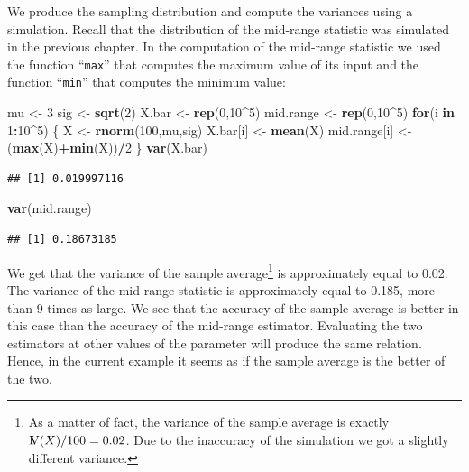\documentclass[]{krantz}
\makeatletter
\newenvironment{Shaded}{\begin{snugshade}}{\end{snugshade}}
\newcommand{\ControlFlowTok}[1]{\textcolor[rgb]{0.13,0.29,0.53}{\textbf{#1}}}
\newcommand{\DecValTok}[1]{\textcolor[rgb]{0.00,0.00,0.81}{#1}}
\newcommand{\KeywordTok}[1]{\textcolor[rgb]{0.13,0.29,0.53}{\textbf{#1}}}
\newcommand{\NormalTok}[1]{#1}
\newcommand{\OperatorTok}[1]{\textcolor[rgb]{0.81,0.36,0.00}{\textbf{#1}}}
\newcommand{\StringTok}[1]{\textcolor[rgb]{0.31,0.60,0.02}{#1}}
\newcommand{\Var}{{\rm I\kern-.3em V}}
\newenvironment{kframe}{%
\medskip{}
\setlength{\fboxsep}{.8em}
 \def\at@end@of@kframe{}%
 \ifinner\ifhmode%
  \def\at@end@of@kframe{\end{minipage}}%
  \begin{minipage}{\columnwidth}%
 \fi\fi%
 \def\FrameCommand##1{\hskip\@totalleftmargin \hskip-\fboxsep
 \colorbox{shadecolor}{##1}\hskip-\fboxsep
     \hskip-\linewidth \hskip-\@totalleftmargin \hskip\columnwidth}%
 \MakeFramed {\advance\hsize-\width
   \@totalleftmargin\z@ \linewidth\hsize
   \@setminipage}}%
 {\par\unskip\endMakeFramed%
 \at@end@of@kframe}
\renewenvironment{Shaded}{\begin{kframe}}{\end{kframe}}
\theoremstyle{definition}
\theoremstyle{definition}
\theoremstyle{definition}
\theoremstyle{remark}
\makeatother
\begin{document}
We produce the sampling distribution and compute the variances using a
simulation. Recall that the distribution of the mid-range statistic was
simulated in the previous chapter. In the computation of the mid-range
statistic we used the function ``\texttt{max}'' that computes the maximum value
of its input and the function ``\texttt{min}'' that computes the minimum value:

\begin{Shaded}
\begin{Highlighting}[]
\NormalTok{mu <-}\StringTok{ }\DecValTok{3}
\NormalTok{sig <-}\StringTok{ }\KeywordTok{sqrt}\NormalTok{(}\DecValTok{2}\NormalTok{)}
\NormalTok{X.bar <-}\StringTok{ }\KeywordTok{rep}\NormalTok{(}\DecValTok{0}\NormalTok{,}\DecValTok{10}\OperatorTok{^}\DecValTok{5}\NormalTok{)}
\NormalTok{mid.range <-}\StringTok{ }\KeywordTok{rep}\NormalTok{(}\DecValTok{0}\NormalTok{,}\DecValTok{10}\OperatorTok{^}\DecValTok{5}\NormalTok{)}
\ControlFlowTok{for}\NormalTok{(i }\ControlFlowTok{in} \DecValTok{1}\OperatorTok{:}\DecValTok{10}\OperatorTok{^}\DecValTok{5}\NormalTok{) \{}
\NormalTok{  X <-}\StringTok{ }\KeywordTok{rnorm}\NormalTok{(}\DecValTok{100}\NormalTok{,mu,sig)}
\NormalTok{  X.bar[i] <-}\StringTok{ }\KeywordTok{mean}\NormalTok{(X)}
\NormalTok{  mid.range[i] <-}\StringTok{ }\NormalTok{(}\KeywordTok{max}\NormalTok{(X)}\OperatorTok{+}\KeywordTok{min}\NormalTok{(X))}\OperatorTok{/}\DecValTok{2}
\NormalTok{\}}
\KeywordTok{var}\NormalTok{(X.bar)}
\end{Highlighting}
\end{Shaded}

\begin{verbatim}
## [1] 0.019997116
\end{verbatim}

\begin{Shaded}
\begin{Highlighting}[]
\KeywordTok{var}\NormalTok{(mid.range)}
\end{Highlighting}
\end{Shaded}

\begin{verbatim}
## [1] 0.18673185
\end{verbatim}

We get that the variance of the sample average\footnote{As a matter of fact, the variance of the sample average is exactly
  \(\Var(X)/100 = 0.02\). Due to the inaccuracy of the simulation we got
  a slightly different variance.} is approximately
equal to 0.02. The variance of the mid-range statistic is approximately
equal to 0.185, more than 9 times as large. We see that the accuracy of
the sample average is better in this case than the accuracy of the
mid-range estimator. Evaluating the two estimators at other values of
the parameter will produce the same relation. Hence, in the current
example it seems as if the sample average is the better of the two.
\end{document}

